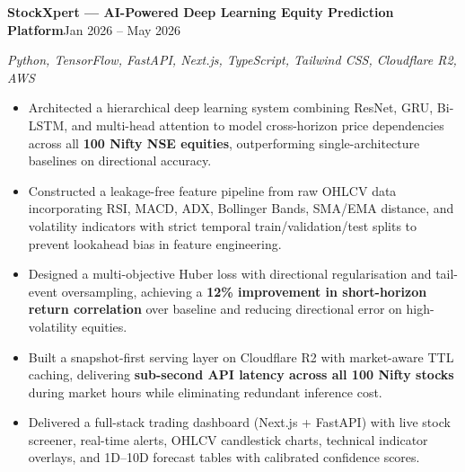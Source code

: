 \documentclass[a4paper,11pt]{article}
\newcommand{\entry}[2]{\noindent\textbf{#1}\hfill{#2}\par}
\newcommand{\subentry}[2]{\noindent\textit{#1}\hfill{\textit{#2}}\par\vspace{2pt}}
\begin{document}
\entry{StockXpert --- AI-Powered Deep Learning Equity Prediction Platform}{Jan 2026 -- May 2026}
\subentry{Python, TensorFlow, FastAPI, Next.js, TypeScript, Tailwind CSS, Cloudflare R2, AWS}{}
\begin{itemize}
  \item Architected a hierarchical deep learning system combining ResNet, GRU, Bi-LSTM, and multi-head attention to model cross-horizon price dependencies across all \textbf{100 Nifty NSE equities}, outperforming single-architecture baselines on directional accuracy.
  \item Constructed a leakage-free feature pipeline from raw OHLCV data incorporating RSI, MACD, ADX, Bollinger Bands, SMA/EMA distance, and volatility indicators with strict temporal train/validation/test splits to prevent lookahead bias in feature engineering.
  \item Designed a multi-objective Huber loss with directional regularisation and tail-event oversampling, achieving a \textbf{12\% improvement in short-horizon return correlation} over baseline and reducing directional error on high-volatility equities.
  \item Built a snapshot-first serving layer on Cloudflare R2 with market-aware TTL caching, delivering \textbf{sub-second API latency across all 100 Nifty stocks} during market hours while eliminating redundant inference cost.
  \item Delivered a full-stack trading dashboard (Next.js + FastAPI) with live stock screener, real-time alerts, OHLCV candlestick charts, technical indicator overlays, and 1D--10D forecast tables with calibrated confidence scores.
\end{itemize}
\end{document}
